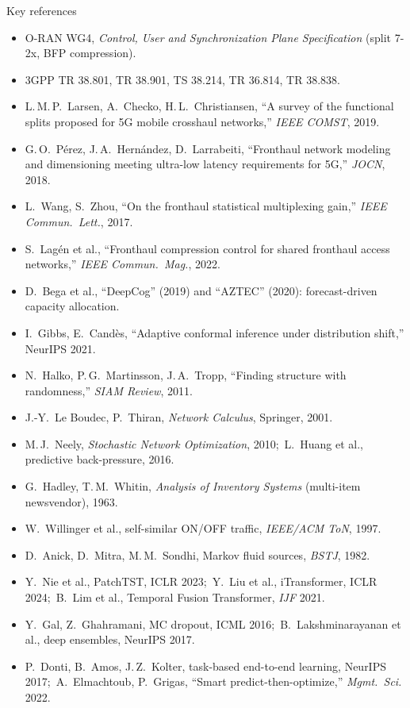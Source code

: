 \documentclass[aspectratio=169,11pt,xcolor=table]{beamer}
\begin{document}
\begin{frame}{Key references}
  \scriptsize
  \begin{itemize}
    \item O-RAN WG4, \emph{Control, User and Synchronization Plane Specification} (split 7-2x, BFP compression).
    \item 3GPP TR 38.801, TR 38.901, TS 38.214, TR 36.814, TR 38.838.
    \item L.\,M.\,P.\ Larsen, A.\ Checko, H.\,L.\ Christiansen, ``A survey of the functional splits proposed for 5G mobile crosshaul networks,'' \emph{IEEE COMST}, 2019.
    \item G.\,O.\ P\'erez, J.\,A.\ Hern\'andez, D.\ Larrabeiti, ``Fronthaul network modeling and dimensioning meeting ultra-low latency requirements for 5G,'' \emph{JOCN}, 2018.
    \item L.\ Wang, S.\ Zhou, ``On the fronthaul statistical multiplexing gain,'' \emph{IEEE Commun.\ Lett.}, 2017.
    \item S.\ Lag\'en et al., ``Fronthaul compression control for shared fronthaul access networks,'' \emph{IEEE Commun.\ Mag.}, 2022.
    \item D.\ Bega et al., ``DeepCog'' (2019) and ``AZTEC'' (2020): forecast-driven capacity allocation.
    \item I.\ Gibbs, E.\ Cand\`es, ``Adaptive conformal inference under distribution shift,'' NeurIPS 2021.
    \item N.\ Halko, P.\,G.\ Martinsson, J.\,A.\ Tropp, ``Finding structure with randomness,'' \emph{SIAM Review}, 2011.
    \item J.-Y.\ Le Boudec, P.\ Thiran, \emph{Network Calculus}, Springer, 2001.
    \item M.\,J.\ Neely, \emph{Stochastic Network Optimization}, 2010;\ L.\ Huang et al., predictive back-pressure, 2016.
    \item G.\ Hadley, T.\,M.\ Whitin, \emph{Analysis of Inventory Systems} (multi-item newsvendor), 1963.
    \item W.\ Willinger et al., self-similar ON/OFF traffic, \emph{IEEE/ACM ToN}, 1997.
    \item D.\ Anick, D.\ Mitra, M.\,M.\ Sondhi, Markov fluid sources, \emph{BSTJ}, 1982.
    \item Y.\ Nie et al., PatchTST, ICLR 2023;\ Y.\ Liu et al., iTransformer, ICLR 2024;\ B.\ Lim et al., Temporal Fusion Transformer, \emph{IJF} 2021.
    \item Y.\ Gal, Z.\ Ghahramani, MC dropout, ICML 2016;\ B.\ Lakshminarayanan et al., deep ensembles, NeurIPS 2017.
    \item P.\ Donti, B.\ Amos, J.\,Z.\ Kolter, task-based end-to-end learning, NeurIPS 2017;\ A.\ Elmachtoub, P.\ Grigas, ``Smart predict-then-optimize,'' \emph{Mgmt.\ Sci.} 2022.
  \end{itemize}
\end{frame}
\end{document}
